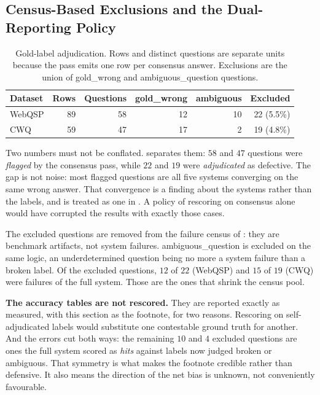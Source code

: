 \subsection{Census-Based Exclusions and the Dual-Reporting Policy}

\begin{table}[!tb]
  \begin{center}
    \caption[Gold-label adjudication]{Gold-label adjudication. Rows and distinct
    questions are separate units because the pass emits one row per consensus
    answer. Exclusions are the union of \textsf{gold\_wrong} and
    \textsf{ambiguous\_question} questions.}
    \label{tab:goldnoise}
    \begin{tabular}{|l|r|r|r|r|r|}
      \hline
      \textbf{Dataset} & \textbf{Rows} & \textbf{Questions} &
      \textbf{gold\_wrong} & \textbf{ambiguous} & \textbf{Excluded} \\
      \hline
      WebQSP & 89 & 58 & 12 & 10 & 22 (5.5\%) \\
      CWQ    & 59 & 47 & 17 &  2 & 19 (4.8\%) \\
      \hline
    \end{tabular}
  \end{center}
\end{table}

Two numbers must not be conflated.  separates them: $58$
and $47$ questions were \emph{flagged} by the consensus pass, while $22$ and
$19$ were \emph{adjudicated} as defective. The gap is not noise: most flagged
questions are all five systems converging on the same wrong answer. That
convergence is a finding about the systems rather than the labels, and is
treated as one in . A policy of rescoring on consensus alone
would have corrupted the results with exactly those cases.

The excluded questions are removed from the failure census of
: they are benchmark artifacts, not system failures.
\textsf{ambiguous\_question} is excluded on the same logic, an
underdetermined question being no more a system failure than a broken label. Of
the excluded questions, $12$ of $22$ (WebQSP) and $15$ of $19$ (CWQ) were
failures of the full system. Those are the ones that shrink the census pool.

\textbf{The accuracy tables are not rescored.} They are reported exactly as
measured, with this section as the footnote, for two reasons. Rescoring on
self-adjudicated labels would substitute one contestable ground truth for
another. And the errors cut both ways: the remaining $10$ and $4$ excluded
questions are ones the full system scored as \emph{hits} against labels now
judged broken or ambiguous. That symmetry is what makes the footnote credible
rather than defensive. It also means the direction of the net bias is unknown,
not conveniently favourable.

